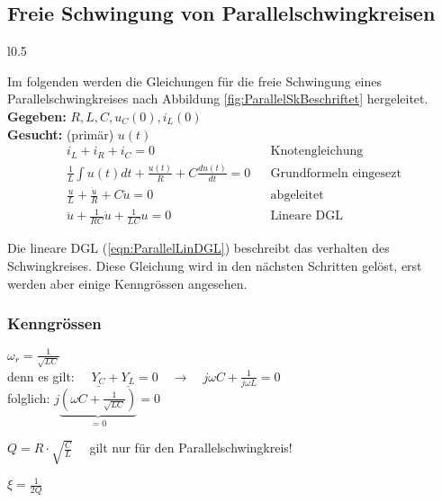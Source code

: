 \subsection{Freie Schwingung von Parallelschwingkreisen}
\begin{wrapfigure}{l}{0.5\textwidth}
	\centering
	
	\caption{Parallelschwingkreis}
	\label{fig:ParallelSkBeschriftet}
\end{wrapfigure}
Im folgenden werden die Gleichungen für die freie Schwingung eines
Parallelschwingkreises nach Abbildung \ref{fig:ParallelSkBeschriftet}
hergeleitet.
\\

\textbf{Gegeben:} $R,L,C, u_C(0), i_L(0)$\\

\textbf{Gesucht:} (primär) $u(t)$ \\

\begin{align}
 i_L + i_R + i_C = 0 
 && \text{Knotengleichung} \nonumber\\
 \frac{1}{L}\int{u(t)}dt + \frac{u(t)}{R} + C \frac{du(t)}{dt} = 0 
 && \text{Grundformeln eingesezt} \nonumber\\
 \frac{u}{L} + \frac{\dot{u}}{R} + C \ddot{u} = 0
 && \text{abgeleitet} \nonumber \\
 \boxed{\ddot{u} + \frac{1}{RC}\dot{u} + \frac{1}{LC}u = 0}
 && \text{Lineare DGL} \label{eqn:ParallelLinDGL}
\end{align}

Die lineare DGL (\ref{eqn:ParallelLinDGL}) beschreibt das verhalten des
Schwingkreises. Diese Gleichung wird in den nächsten Schritten gelöst, erst
werden aber einige Kenngrössen angesehen.

\subsubsection{Kenngrössen}
\begin{description}
[style=multiline,topsep=0pt,leftmargin=4.5cm,rightmargin=2cm]
\item[Resonanzfrequenz]
	$\omega_r = \frac{1}{\sqrt{LC}} $\\
	denn es gilt:
	$\quad \underline{Y_C} + \underline{Y_L} = 0  \quad \rightarrow \quad j
	\omega C + \frac{1}{j \omega L} = 0$ \\
	folglich: $j\underbrace{\left(\omega C + \frac{1}{\sqrt{LC}}\right)}_{=0} = 0$
\item[Güte Q] 
	$Q = R \cdot \sqrt{\frac{C}{L}} \quad$ gilt nur für den
	Parallelschwingkreis!
\item[Dämpfungsgrad $\xi$]
	$\xi = \frac{1}{2Q}$
\end{description}


